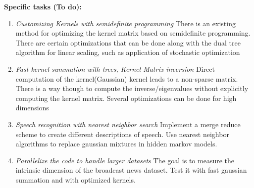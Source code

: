 \documentclass[12pt]{article}
\begin{document}
\textbf{Specific tasks (To do):}
\begin{enumerate}
  \item \textit{Customizing Kernels with semidefinite programming}
  There is an existing method for optimizing the kernel matrix based
  on semidefinite programming. There are certain optimizations that
  can be done along with the dual tree algorithm for linear scaling,
  such as application of stochastic optimization
  \item \textit{Fast kernel summation with trees, Kernel Matrix
  inversion} Direct computation of the kernel(Gaussian) kernel leads
  to a non-sparse matrix. There is a way though to compute the
  inverse/eigenvalues without explicitly computing the kernel
  matrix. Several optimizations can be done for high dimensions
  \item \textit{Speech recognition with nearest neighbor search}
  Implement a merge reduce scheme to create different descriptions
  of speech. Use nearest neighbor algorithms to replace gaussian
  mixtures in hidden markov models.
  \item \textit{Parallelize the code to handle larger datasets} The
  goal is to measure the intrinsic dimension of the broadcast news
  dataset. Test it with fast gaussian summation and with optimized
  kernels.
\end{enumerate}
\end{document}
